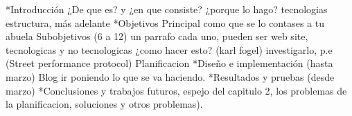 *Introducción
¿De que es? y ¿en que consiste?
¿porque lo hago?
tecnologias
estructura, más adelante
*Objetivos
Principal como que se lo contases a tu abuela
Subobjetivos (6 a 12) un parrafo cada uno, pueden ser web site, tecnologicas y no tecnologicas ¿como hacer esto? (karl fogel) investigarlo, p.e (Street performance protocol)
Planificacion
*Diseño e implementación (hasta marzo) Blog ir poniendo lo que se va haciendo.
*Resultados y pruebas (desde marzo)
*Conclusiones y trabajos futuros, espejo del capitulo 2, los problemas de la planificacion, soluciones y otros problemas).
